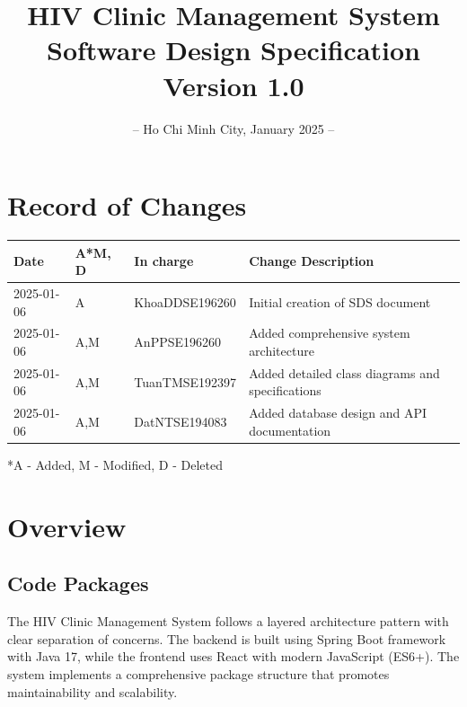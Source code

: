 \documentclass[12pt,a4paper]{article}
\title{
    \vspace{-2cm}
    \Huge\textbf{HIV Clinic Management System}\\
    \vspace{1cm}
    \Large\textbf{Software Design Specification}\\
    \vspace{2cm}
    \normalsize Version 1.0
}
\author{}
\date{
    \vspace{4cm}
    – Ho Chi Minh City, January 2025 –
}
\begin{document}
\maketitle
\thispagestyle{empty}

\newpage

\section*{Record of Changes}
\begin{longtable}{|p{3cm}|p{2cm}|p{3cm}|p{6cm}|}
\hline
\textbf{Date} & \textbf{A*M, D} & \textbf{In charge} & \textbf{Change Description} \\
\hline
2025-01-06 & A & KhoaDDSE196260 & Initial creation of SDS document \\
\hline
2025-01-06 & A,M & AnPPSE196260 & Added comprehensive system architecture \\
\hline
2025-01-06 & A,M & TuanTMSE192397 & Added detailed class diagrams and specifications \\
\hline
2025-01-06 & A,M & DatNTSE194083 & Added database design and API documentation \\
\hline
\end{longtable}

\footnotesize{*A - Added, M - Modified, D - Deleted}

\newpage

\tableofcontents

\newpage

\section{Overview}

\subsection{Code Packages}

The HIV Clinic Management System follows a layered architecture pattern with clear separation of concerns. The backend is built using Spring Boot framework with Java 17, while the frontend uses React with modern JavaScript (ES6+). The system implements a comprehensive package structure that promotes maintainability and scalability.
\end{document}
